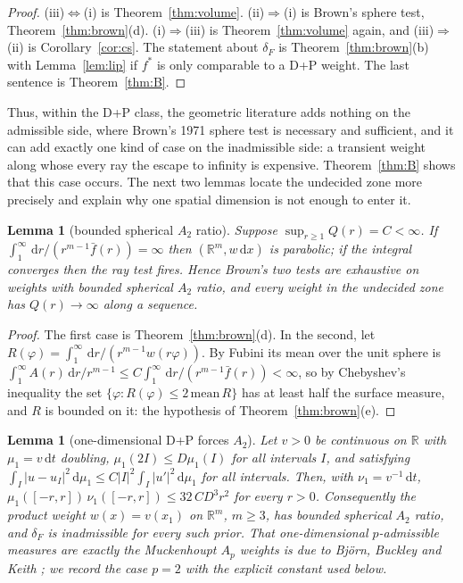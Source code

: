 \documentclass[11pt]{amsart}
\newcommand{\R}{\mathbb{R}}
\newcommand{\dd}{\,\mathrm{d}}
\newcommand{\abs}[1]{\lvert #1\rvert}
\newcommand{\fbar}{\bar f}
\theoremstyle{plain}
\newtheorem{lemma}[theorem]{Lemma}
\theoremstyle{definition}
\theoremstyle{remark}
\begin{document}
\begin{proof}
(iii)$\Leftrightarrow$(i) is Theorem~\ref{thm:volume}. (ii)$\Rightarrow$(i) is
Brown's sphere test, Theorem~\ref{thm:brown}(d). (i)$\Rightarrow$(iii) is
Theorem~\ref{thm:volume} again, and (iii)$\Rightarrow$(ii) is
Corollary~\ref{cor:cs}. The statement about $\delta_F$ is
Theorem~\ref{thm:brown}(b) with Lemma~\ref{lem:lip} if $f^*$ is only
comparable to a D+P weight. The last sentence is Theorem~\ref{thm:B}.
\end{proof}

Thus, within the D+P class, the geometric literature adds nothing on the
admissible side, where Brown's 1971 sphere test is necessary and sufficient, and
it can add exactly one kind of case on the inadmissible side: a transient weight
along whose every ray the escape to infinity is expensive. Theorem~\ref{thm:B}
shows that this case occurs. The next two lemmas locate the undecided zone more
precisely and explain why one spatial dimension is not enough to enter it.

\begin{lemma}[bounded spherical $A_2$ ratio]\label{lem:a2}
Suppose $\sup_{r\ge1}Q(r)=C<\infty$. If
$\int_1^\infty\dd r/(r^{m-1}\fbar(r))=\infty$ then $(\R^m,w\dd x)$ is parabolic;
if the integral converges then the ray test fires. Hence Brown's two tests are
exhaustive on weights with bounded spherical $A_2$ ratio, and every weight in
the undecided zone has $Q(r)\to\infty$ along a sequence.
\end{lemma}

\begin{proof}
The first case is Theorem~\ref{thm:brown}(d). In the second, let
$R(\varphi)=\int_1^\infty\dd r/(r^{m-1}w(r\varphi))$. By Fubini its mean over
the unit sphere is $\int_1^\infty A(r)\dd r/r^{m-1}\le
C\int_1^\infty\dd r/(r^{m-1}\fbar(r))<\infty$, so by Chebyshev's inequality the
set $\{\varphi:R(\varphi)\le2\,\mathrm{mean}\,R\}$ has at least half the surface
measure, and $R$ is bounded on it: the hypothesis of
Theorem~\ref{thm:brown}(e).
\end{proof}

\begin{lemma}[one-dimensional D+P forces $A_2$]\label{lem:1d}
Let $v>0$ be continuous on $\R$ with $\mu_1=v\dd t$ doubling, $\mu_1(2I)\le
D\mu_1(I)$ for all intervals $I$, and satisfying
$\int_I\abs{u-u_I}^2\dd\mu_1\le C\abs I^2\int_I\abs{u'}^2\dd\mu_1$ for all
intervals. Then, with $\nu_1=v^{-1}\dd t$,
$\mu_1([-r,r])\,\nu_1([-r,r])\le32\,CD^3r^2$ for every $r>0$. Consequently the
product weight $w(x)=v(x_1)$ on $\R^m$, $m\ge3$, has bounded spherical $A_2$
ratio, and $\delta_F$ is inadmissible for every such prior. That one-dimensional
$p$-admissible measures are exactly the Muckenhoupt $A_p$ weights is due to
Bj\"orn, Buckley and Keith \cite{bbk2006}; we record the case $p=2$ with the
explicit constant used below.
\end{lemma}
\end{document}
